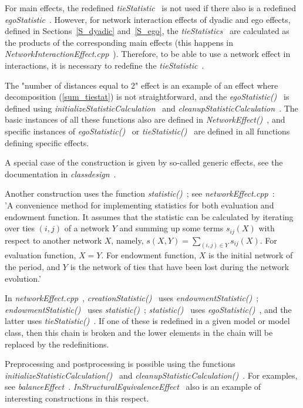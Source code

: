 \documentclass[a4paper,12pt,fleqn]{article}
\newcommand{\nnm}[1]{\textsf{\small\textit{#1}\ }}
\newcommand{\nmm}[1]{\nnm{#1}}
\begin{document}
For main effects, the redefined \nnm{tieStatistic} is not used
if there also is a redefined \nnm{egoStatistic}.
However, for network interaction effects of dyadic and ego effects,
defined in Sections~\ref{S_dyadic} and~\ref{S_ego},
the \nnm{tieStatistics} are calculated
as the products of the corresponding main
effects (this happens in \nnm{NetworkInteractionEffect.cpp}).
Therefore, to be able to use a network effect in interactions,
it is necessary to redefine the \nnm{tieStatistic}.

The "number of distances equal to 2" effect is an example of an effect
where decomposition (\ref{sum_tiestat}) is not straightforward,
and the \nnm{egoStatistic()}
is defined using \nnm{initializeStatisticCalculation} and
\nnm{cleanupStatisticCalculation}.
The basic instances of all these functions also are defined in \nnm{NetworkEffect()},
and specific instances of \nnm{egoStatistic()}
or \nnm{tieStatistic()} are defined in all functions defining specific effects.

A special case of the construction is given by so-called generic effects,
see the documentation in \nnm{classdesign}.

Another construction uses the function \nnm{statistic()}; see
\nnm{networkEffect.cpp}:\\
'A convenience method for implementing statistics for both evaluation and
endowment function. It assumes that the statistic can be calculated by
iterating over ties $(i,j)$ of a network $Y$ and summing up some terms
$s_{ij}(X)$ with respect to another network $X$, namely,
$s(X,Y) = \sum_{(i,j) \in Y} s_{ij}(X)$.
For evaluation function, $X = Y$.
For endowment function, $X$ is the initial network of the period, and $Y$ is the
network of ties that have been lost during the network evolution.'

In \nnm{networkEffect.cpp}, \nnm{creationStatistic()} uses
\nmm{endowmentStatistic()};
\nmm{endowmentStatistic()} uses \nnm{statistic()};
\nnm{statistic()} uses \nnm{egoStatistic()}, and the latter uses
\nnm{tieStatistic()}.
If one of these is redefined in a given model or model class,
then this chain is broken and the lower elements in the chain
will be replaced by the redefinitions.

Preprocessing and postprocessing is possible using the functions
\nnm{initializeStatisticCalculation()} and
\nnm{cleanupStatisticCalculation()}. For examples, see
\nnm{balanceEffect}.
\nnm{InStructuralEquivalenceEffect} also is an example of
interesting constructions in this respect.
\end{document}
